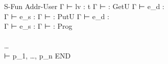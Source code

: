 {{    }
    {S-Fun}{ 
               { }
               {}
    }
    {Addr-User}{ 
               { Γ ⊢ lv : t }
               { Γ ⊢  :  }
    }
    {GetU}{ 
              { Γ ⊢ e_d : 
             \\ Γ ⊢ e_s : 
              }
              { Γ ⊢  : \tInt }
    }
    {PutU}{ 
              { Γ ⊢ e_d : 
             \\ Γ ⊢ e_s : 
              }
              { Γ ⊢  : \tInt }
    }
    {Prog}{ 
                { 
               \\ 
               \\ …
               \\ 
                }
                { ⊢ p_1, …, p_n}
    }
    {END}
}

